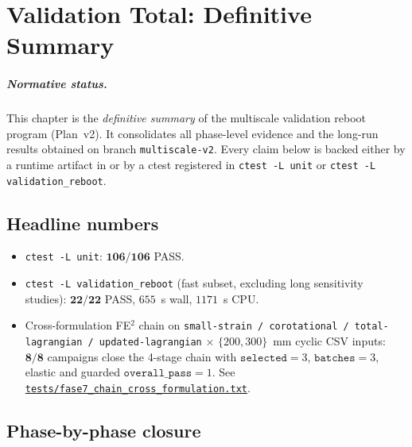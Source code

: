 
\chapter{Validation Total: Definitive Summary}
\label{ch:validation-total-summary}

\paragraph{Normative status.}
This chapter is the \emph{definitive summary} of the multiscale
validation reboot program (Plan~v2). It consolidates all phase-level
evidence and the long-run results obtained on branch
\texttt{multiscale-v2}. Every claim below is backed either by a
runtime artifact in  or by a
ctest registered in \texttt{ctest -L unit} or
\texttt{ctest -L validation\_reboot}.

\section{Headline numbers}

\begin{itemize}
  \item \texttt{ctest -L unit}: \(\mathbf{106 / 106}\) PASS.
  \item \texttt{ctest -L validation\_reboot} (fast subset, excluding
        long sensitivity studies): \(\mathbf{22 / 22}\) PASS,
        \(655\)~s wall, \(1171\)~s CPU.
  \item Cross-formulation FE\(^2\) chain on
        \texttt{small-strain / corotational / total-lagrangian /
        updated-lagrangian} \(\times\) \(\{200, 300\}\)~mm
        cyclic CSV inputs: \(\mathbf{8/8}\) campaigns close the
        4-stage chain with \(\texttt{selected}=3\),
        \(\texttt{batches}=3\), elastic and guarded
        \(\texttt{overall\_pass}=1\). See
        \href{run:tests/fase7_chain_cross_formulation.txt}{%
        \texttt{tests/fase7\_chain\_cross\_formulation.txt}}.
\end{itemize}

\section{Phase-by-phase closure}

